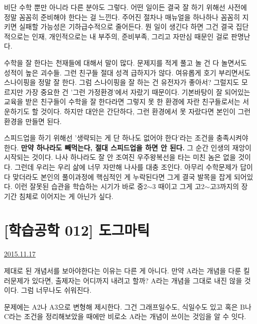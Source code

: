 비단 수학 뿐만 아니라 다른 분야도 그렇다.
어떤 일이든 결국 잘 하기 위해선 사전에 정말 꼼꼼히 준비해야 한다는 걸 느낀다.
주어진 절차나 매뉴얼을 하나하나 꼼꼼히 지키면 실패할 가능성은 기하급수적으로 줄어든다.
뭔 일이 생긴다 하면 그건 결국 집단적으로는 인재, 개인적으로는 내 부주의, 준비부족, 그리고 자만심 때문인 걸로 판명난다.
\vspace{5mm}

수학을 잘 한다는 천재들에 대해서 말이 많다.
문제지를 적게 풀고 놀 건 다 놀면서도 성적이 높은 괴수들.
그런 친구들 절대 성격 급하지가 않다. 여유롭게 호기 부리면서도 스나이핑을 정말 잘 한다.
그럼 스나이핑을 잘 하는 건 유전자가 좋아서? 그럴지도 모르지만 가장 중요한 건 '그런 가정환경'에서 자랐기 때문이다.
기본바탕이 잘 되어있는 교육을 받은 친구들이 수학을 잘 한다라면 그렇지 못 한 환경에 자란 친구들로서는 서운하기도 할 것이다.
하지만 대안은 간단하다, 그런 환경에서 못 자랐다면 본인이 그런 환경을 만들면 된다.
\vspace{5mm}

스피드업을 하기 위해선 '생략되는 게 단 하나도 없어야 한다'라는 조건을 충족시켜야 한다.
\textbf{만약 하나라도 빼먹는다, 절대 스피드업을 하면 안 된다.} 그 순간 인생의 재앙이 시작되는 것이다.
나사 하나라도 잘 안 조여진 우주왕복선을 타는 미친 놈은 없을 것이다. 그런데 우리는 우리 삶에 너무 자만해 나사를 대충 조인다.
아무리 수학문제가 답이 다 맞더라도 본인의 풀이과정에 핵심적인 게 누락된다면 그게 결국 발목을 잡게 되어있다.
이런 잘못된 습관을 학습하는 시기가 바로 중2$\sim$3 때이고 그게 고2$\sim$고3까지의 장기간 침체로 이어지는 게 아닌가 싶다.
\vspace{5mm}




\section{[학습공학 012] 도그마틱}
\href{https://www.kockoc.com/Apoc/495293}{2015.11.17}

\vspace{5mm}

제대로 된 개념서를 보아야한다는 이유는 다른 게 아니다.
만약 A라는 개념을 다룬 킬러문제가 있다면, 출제자는 어디까지 내려고 할까?
A라는 개념을 그대로 내진 않을 것이다. 그럼 너무나도 쉬워진다.
\vspace{5mm}

문제에는 A2나 A3으로 변형해 제시한다. 그건 그래프일수도, 식일수도 있고
혹은 B나 C라는 조건을 정리해보았을 때에만 비로소 A라는 개념이 쓰이는 것임을 알 수 잇다.
\vspace{5mm}

